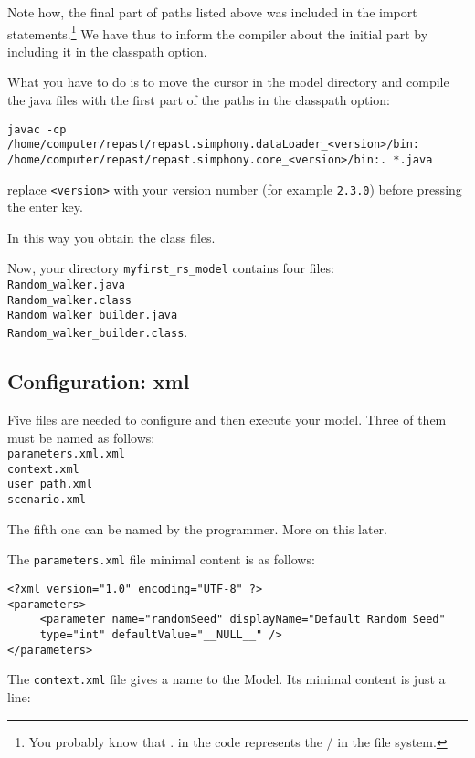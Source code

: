 \documentclass{article}
\begin{document}
Note how, the final part of paths listed above was included in the import statements.\footnote{You probably know that . in the code represents the / in the file system.} 
We have thus to inform the compiler about the initial part by including it in the classpath option. 

What you have to do is to move the cursor in the model directory and compile the java files with the first part of the paths in the classpath option:

\begin{verbatim}
javac -cp /home/computer/repast/repast.simphony.dataLoader_<version>/bin:
/home/computer/repast/repast.simphony.core_<version>/bin:. *.java
\end{verbatim}
replace \verb+<version>+ with your version number (for example \verb+2.3.0+) before pressing the enter key. 

In this way you obtain the class files.

Now, your directory \verb+myfirst_rs_model+ contains four files:\\
\verb+Random_walker.java+\\
\verb+Random_walker.class+\\
\verb+Random_walker_builder.java+\\
\verb+Random_walker_builder.class+.

\subsection{Configuration: xml}

Five files are needed to configure and then execute your model. 
Three of them must be named as follows:\\
\verb+parameters.xml.xml+\\
\verb+context.xml+\\
\verb+user_path.xml+\\
\verb+scenario.xml+

The fifth one can be named by the programmer. More on this later.


The \verb+parameters.xml+ file minimal content is as follows:

\begin{verbatim}
<?xml version="1.0" encoding="UTF-8" ?>
<parameters>
	 <parameter name="randomSeed" displayName="Default Random Seed" 
	 type="int" defaultValue="__NULL__" />
</parameters>

\end{verbatim}


The \verb+context.xml+ file gives a name to the Model. Its minimal content is just a line:
\end{document}
